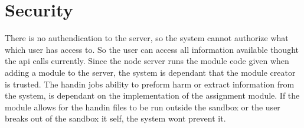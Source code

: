 \section{Security}
There is no authendication to the server, so the system cannot authorize what which user has access to. So the user can access all information available thought the api calls currently. Since the node server runs the module code given when adding a module to the server, the system is dependant that the module creator is trusted. The handin jobs ability to preform harm or extract information from the system, is dependant on the implementation of the assignment module. If the module allows for the handin files to be run outside the sandbox or the user breaks out of the sandbox it self, the system wont prevent it.